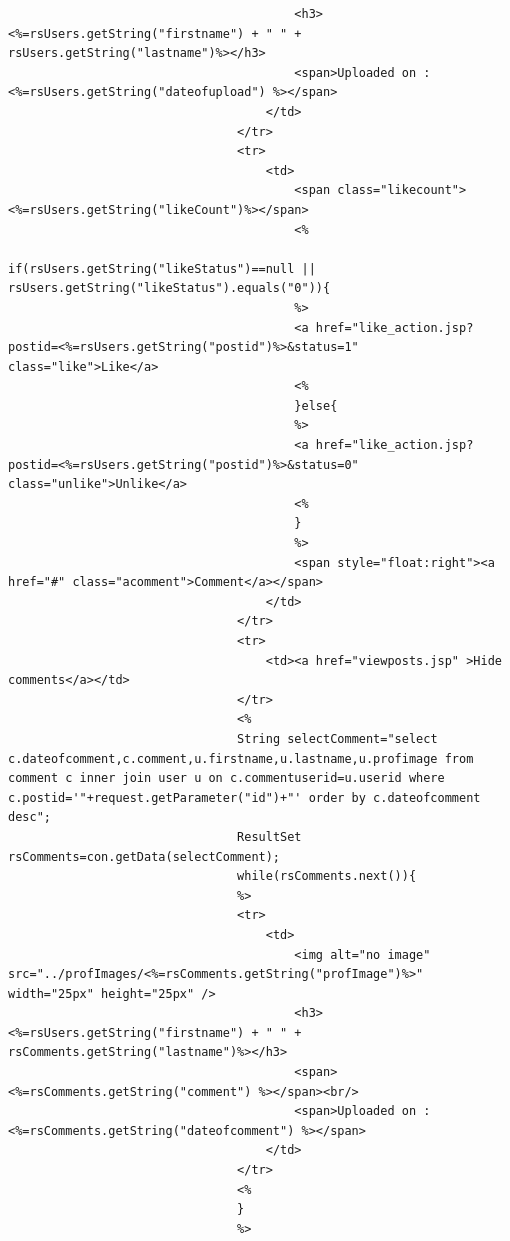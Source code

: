\documentclass[a4paper,12pt]{article}
\begin{document}
\begin{verbatim}
                                        <h3><%=rsUsers.getString("firstname") + " " + rsUsers.getString("lastname")%></h3>
                                        <span>Uploaded on : <%=rsUsers.getString("dateofupload") %></span>
                                    </td>
                                </tr>
                                <tr>
                                    <td>
                                        <span class="likecount"><%=rsUsers.getString("likeCount")%></span>
                                        <%
                                        if(rsUsers.getString("likeStatus")==null || rsUsers.getString("likeStatus").equals("0")){
                                        %>
                                        <a href="like_action.jsp?postid=<%=rsUsers.getString("postid")%>&status=1" class="like">Like</a>
                                        <%
                                        }else{
                                        %>
                                        <a href="like_action.jsp?postid=<%=rsUsers.getString("postid")%>&status=0" class="unlike">Unlike</a>
                                        <%
                                        }
                                        %>
                                        <span style="float:right"><a href="#" class="acomment">Comment</a></span>
                                    </td>
                                </tr>
                                <tr>
                                    <td><a href="viewposts.jsp" >Hide comments</a></td>
                                </tr>
                                <%
                                String selectComment="select c.dateofcomment,c.comment,u.firstname,u.lastname,u.profimage from comment c inner join user u on c.commentuserid=u.userid where c.postid='"+request.getParameter("id")+"' order by c.dateofcomment desc";
                                ResultSet rsComments=con.getData(selectComment);
                                while(rsComments.next()){
                                %>
                                <tr>
                                    <td>
                                        <img alt="no image" src="../profImages/<%=rsComments.getString("profImage")%>" width="25px" height="25px" />
                                        <h3><%=rsUsers.getString("firstname") + " " + rsComments.getString("lastname")%></h3>
                                        <span><%=rsComments.getString("comment") %></span><br/>
                                        <span>Uploaded on : <%=rsComments.getString("dateofcomment") %></span>
                                    </td>
                                </tr>
                                <%
                                }
                                %>
                                

\end{verbatim}
\end{document}
